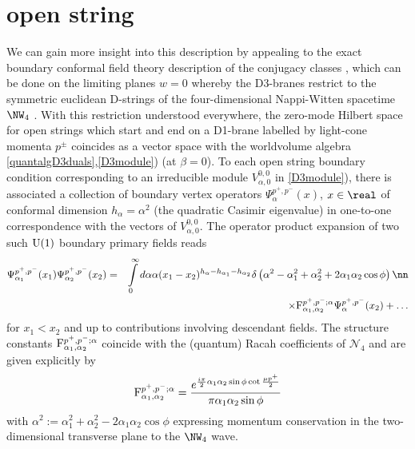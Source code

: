 \section{open string}
We can gain more insight into this description by appealing to the
exact boundary conformal field theory description of the conjugacy
classes \cite{DK2,Hikida1}, which can be done on the limiting planes
$w=0$ whereby the D3-branes restrict to the symmetric euclidean
D-strings of the four-dimensional Nappi-Witten spacetime
$\NW_4$ \cite{FS1}. With this restriction understood everywhere, the
zero-mode Hilbert space for open strings which start and end on a
D1-brane labelled by light-cone momenta $p^\pm$ coincides as a vector
space with the worldvolume algebra
\eqref{quantalgD3duals},\ref{D3module}) (at $\beta=0$). To each open
string boundary condition corresponding to an irreducible module
$V_{\alpha,0}^{0,0}$ in \eqref{D3module}), there is associated a
collection of boundary vertex operators $\Psi_\alpha^{p^+,p^-}(x)$,
$x\in\real$ of conformal dimension $h_\alpha=\alpha^2$ (the quadratic
Casimir eigenvalue) in one-to-one correspondence with the vectors of
$V_{\alpha,0}^{0,0}$. The operator product expansion of two such ${\rm
  U}(1)$ boundary primary fields reads \cite{DK2}
\begin{eqnarray}
\Psi_{\alpha_1}^{p^+,p^-}(x_1) \Psi_{\alpha_2}^{p^+,p^-}(x_2)&=&
\int\limits_0^\infty d\alpha \alpha (x_1-x_2)^{h_\alpha-
h_{\alpha_1}-h_{\alpha_2}} \delta\left(\alpha^2-
\alpha_1^2+\alpha_2^2+2\alpha_1 \alpha_2 \cos\phi\right)
\nn\\ &&\times  {\rm F}^{p^+,p^-;\alpha}_{\alpha_1,\alpha_2} 
\Psi_{\alpha}^{p^+,p^-}(x_2)+\dots
\label{OPEbdryfields}\end{eqnarray}
for $x_1<x_2$ and up to contributions involving descendant fields. The
structure constants ${\rm F}^{p^+,p^-;\alpha}_{\alpha_1,\alpha_2}$
coincide with the (quantum) Racah coefficients of $\mathcal{N}_4$ and
are given explicitly by
\begin{equation}
{\rm F}^{p^+,p^-;\alpha}_{\alpha_1,\alpha_2}=\frac{ e^{\frac{ i\pi}2 
\alpha_1 \alpha_2 \sin\phi \cot\frac{\mu p^+}2}}{
\pi \alpha_1 \alpha_2 \sin\phi}
\label{Racahquantum}\end{equation}
with
$\alpha^2:=\alpha_1^2+\alpha_2^2-2\alpha_1 \alpha_2 \cos\phi$
expressing momentum conservation in the two-dimensional transverse
plane to the $\NW_4$ wave.


